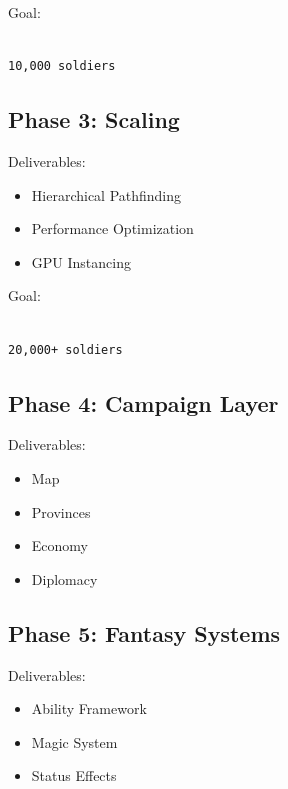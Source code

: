 \documentclass[11pt,a4paper]{article}
\begin{document}
Goal:

\begin{verbatim}

10,000 soldiers

\end{verbatim}

\subsection{Phase 3: Scaling}

Deliverables:

\begin{itemize}

    \item Hierarchical Pathfinding

    \item Performance Optimization

    \item GPU Instancing

\end{itemize}

Goal:

\begin{verbatim}

20,000+ soldiers

\end{verbatim}

\subsection{Phase 4: Campaign Layer}

Deliverables:

\begin{itemize}

    \item Map

    \item Provinces

    \item Economy

    \item Diplomacy

\end{itemize}

\subsection{Phase 5: Fantasy Systems}

Deliverables:

\begin{itemize}

    \item Ability Framework

    \item Magic System

    \item Status Effects

\end{itemize}
\end{document}
